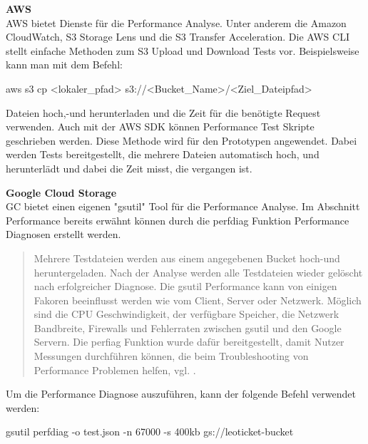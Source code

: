 \textbf{AWS}\\

AWS bietet Dienste für die Performance Analyse. Unter anderem die Amazon CloudWatch, S3 Storage Lens und die S3 Transfer Acceleration. Die AWS CLI stellt einfache Methoden zum S3 Upload und Download Tests vor. Beispielsweise kann man mit dem Befehl:


\begin{code} aws s3 cp <lokaler_pfad> s3://<Bucket_Name>/<Ziel_Dateipfad>\end{code}

Dateien hoch,-und herunterladen und die Zeit für die benötigte Request verwenden. Auch mit der AWS SDK können Performance Test Skripte geschrieben werden. Diese Methode wird für den Prototypen angewendet. Dabei werden Tests bereitgestellt, die mehrere Dateien automatisch hoch, und herunterlädt und dabei die Zeit misst, die vergangen ist. 

\newpage

\textbf{Google Cloud Storage}\\

GC bietet einen eigenen "gsutil" Tool für die Performance Analyse. Im Abschnitt Performance bereits erwähnt können durch die perfdiag Funktion Performance Diagnosen erstellt werden. 

\begin{quote}
	Mehrere Testdateien werden aus einem angegebenen Bucket hoch-und heruntergeladen. Nach der Analyse werden alle Testdateien wieder gelöscht nach erfolgreicher Diagnose. Die gsutil Performance kann von einigen Fakoren beeinflusst werden wie vom Client, Server oder Netzwerk. Möglich sind die CPU Geschwindigkeit, der verfügbare Speicher, die Netzwerk Bandbreite, Firewalls und Fehlerraten zwischen gsutil und den Google Servern. Die perfiag Funktion wurde dafür bereitgestellt, damit Nutzer Messungen durchführen können, die beim Troubleshooting von Performance Problemen helfen, vgl. \cite{gc-perfdiag}.
\end{quote}

Um die Performance Diagnose auszuführen, kann der folgende Befehl verwendet werden:

\begin{code} gsutil perfdiag -o test.json -n 67000 -s 400kb gs://leoticket-bucket \end{code}

